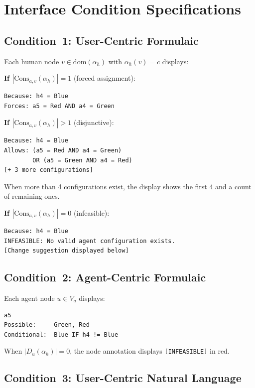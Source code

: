 \documentclass[10pt]{article}
\theoremstyle{definition}
\begin{document}
\section{Interface Condition Specifications}
\label{app:conditions}

\subsection{Condition~1: User-Centric Formulaic}

Each human node $v \in \mathrm{dom}(\alpha_h)$ with $\alpha_h(v) = c$ displays:

\noindent\textbf{If $|\mathrm{Cons}_{a,v}(\alpha_h)| = 1$} (forced assignment):
\begin{lstlisting}
Because: h4 = Blue
Forces: a5 = Red AND a4 = Green
\end{lstlisting}

\noindent\textbf{If $|\mathrm{Cons}_{a,v}(\alpha_h)| > 1$} (disjunctive):
\begin{lstlisting}
Because: h4 = Blue
Allows: (a5 = Red AND a4 = Green)
        OR (a5 = Green AND a4 = Red)
[+ 3 more configurations]
\end{lstlisting}
When more than 4 configurations exist, the display shows the first 4 and a count of remaining ones.

\noindent\textbf{If $|\mathrm{Cons}_{a,v}(\alpha_h)| = 0$} (infeasible):
\begin{lstlisting}
Because: h4 = Blue
INFEASIBLE: No valid agent configuration exists.
[Change suggestion displayed below]
\end{lstlisting}

\subsection{Condition~2: Agent-Centric Formulaic}

Each agent node $u \in V_a$ displays:
\begin{lstlisting}
a5
Possible:     Green, Red
Conditional:  Blue IF h4 != Blue
\end{lstlisting}
When $|D_u(\alpha_h)| = 0$, the node annotation displays \texttt{[INFEASIBLE]} in red.

\subsection{Condition~3: User-Centric Natural Language}
\end{document}
